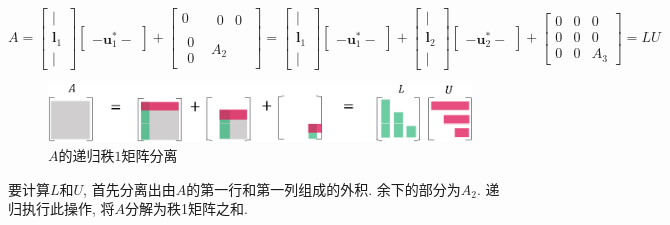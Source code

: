 \documentclass[letterpaper]{article}
\begin{document}
\begin{equation*}
  A = 
      \begin{bmatrix}
        |\\
        \bm{l}_1\\
        |
      \end{bmatrix}
      \begin{bmatrix}
        -  \bm{u}^*_1  -
      \end{bmatrix}
  +  \begin{bmatrix}
      0 & \begin{matrix} 0 & 0 \end{matrix}\\
      \begin{matrix} 0 \\ 0 \end{matrix} & A_2
    \end{bmatrix}
  = 
  \begin{bmatrix}
    |\\
    \bm{l}_1\\
    |
  \end{bmatrix}
  \begin{bmatrix}
    - \bm{u}^*_1 -
  \end{bmatrix}
  +
  \begin{bmatrix}
    |\\
    \bm{l}_2\\
    |
  \end{bmatrix}
  \begin{bmatrix}
    - \bm{u}^*_2  -
  \end{bmatrix}
  +  \begin{bmatrix}
  0 & 0 & 0\\
  0 & 0 & 0 \\
  0 & 0 & A_3
  \end{bmatrix} = LU
\end{equation*}
 

\begin{figure}[H]
  \centering
  \includegraphics[scale=0.8]{LU1.eps}
\caption{$A的递归秩1矩阵分离$}
\end{figure}

要计算$L$和$U$, 首先分离出由$A$的第一行和第一列组成的外积. 
余下的部分为$A_2$. 
递归执行此操作, 将$A$分解为秩1矩阵之和. 
\end{document}
